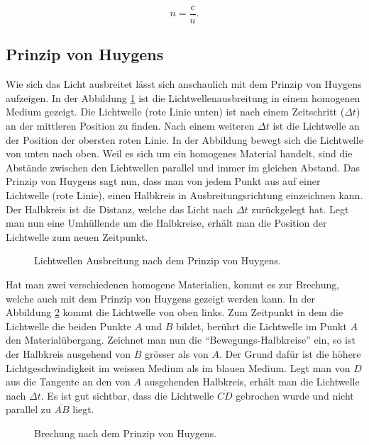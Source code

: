 \begin{refsection}
\begin{equation}
  n = \frac{c}{u}.
\end{equation}


\subsection{Prinzip von Huygens}
Wie sich das Licht ausbreitet lässt sich anschaulich mit dem Prinzip
von Huygens aufzeigen.  In der Abbildung \ref{fig:huygens1} ist die
Lichtwellenausbreitung in einem homogenen Medium gezeigt.  Die
Lichtwelle (rote Linie unten) ist nach einem Zeitschritt
(\(\Delta t\)) an der mittleren Position zu finden.  Nach einem
weiteren \(\Delta t\) ist die Lichtwelle an der Position der obersten
roten Linie.  In der Abbildung bewegt sich die Lichtwelle von unten
nach oben.  Weil es sich um ein homogenes Material handelt, sind die
Abstände zwischen den Lichtwellen parallel und immer im gleichen
Abstand.  Das Prinzip von Huygens sagt nun, dass man von jedem Punkt
aus auf einer Lichtwelle (rote Linie), einen Halbkreis in
Ausbreitungsrichtung einzeichnen kann.  Der Halbkreis ist die Distanz,
welche das Licht nach \(\Delta t\) zurückgelegt hat.  Legt man nun
eine Umhüllende um die Halbkreise, erhält man die Position der
Lichtwelle zum neuen Zeitpunkt.

\begin{figure}
  \centering
  
  \caption{Lichtwellen Ausbreitung nach dem Prinzip von Huygens.}
  \label{fig:huygens1}
\end{figure}

Hat man zwei verschiedenen homogene Materialien, kommt es zur
Brechung, welche auch mit dem Prinzip von Huygens gezeigt werden kann.
In der Abbildung \ref{fig:huygens2} kommt die Lichtwelle von oben
links.  Zum Zeitpunkt in dem die Lichtwelle die beiden Punkte \(A\)
und \(B\) bildet, berührt die Lichtwelle im Punkt \(A\) den
Materialübergang.  Zeichnet man nun die ``Bewegungs-Halbkreise'' ein,
so ist der Halbkreis ausgehend von \(B\) grösser als von \(A\).  Der
Grund dafür ist die höhere Lichtgeschwindigkeit im weissen Medium als
im blauen Medium.  Legt man von \(D\) aus die Tangente an den von
\(A\) ausgehenden Halbkreis, erhält man die Lichtwelle nach
\(\Delta t\).  Es ist gut sichtbar, dass die Lichtwelle
\(\overline{CD}\) gebrochen wurde und nicht parallel zu
\(\overline{AB}\) liegt.

\begin{figure}
  \centering
  
  \caption{Brechung nach dem Prinzip von Huygens.}
  \label{fig:huygens2}
\end{figure}


\end{refsection}

